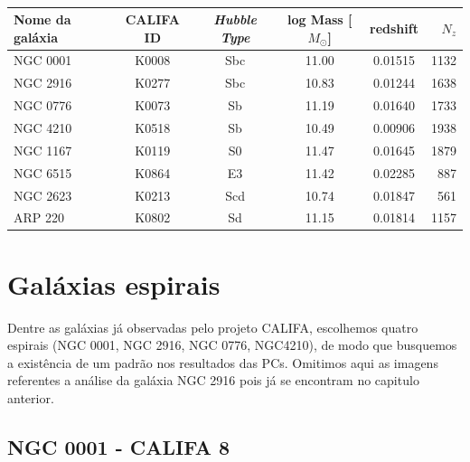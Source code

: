 \begin{table}
	\caption[Relação de galáxias do CALIFA usadas neste trabalho.]
	{}
	\begin{tabular}{l c c c c r}
		Nome da galáxia & CALIFA ID & {\em Hubble Type} & log Mass [$M_\odot$] & redshift & $N_z$ \\
		\midrule
		NGC 0001 & K0008 & Sbc & 11.00 & 0.01515 & 1132 \\
		NGC 2916 & K0277 & Sbc & 10.83 & 0.01244 & 1638 \\
		NGC 0776 & K0073 & Sb  & 11.19 & 0.01640 & 1733 \\
		NGC 4210 & K0518 & Sb  & 10.49 & 0.00906 & 1938 \\
		NGC 1167 & K0119 & S0  & 11.47 & 0.01645 & 1879 \\
		NGC 6515 & K0864 & E3  & 11.42 & 0.02285 & 887  \\
		NGC 2623 & K0213 & Scd & 10.74 & 0.01847 & 561  \\
		ARP 220  & K0802 & Sd  & 11.15 & 0.01814 & 1157 \\
	\end{tabular}
	\label{tab:amostraGalaxias}
\end{table}

\section{Galáxias espirais}
\label{sec:result:spirals}

Dentre as galáxias já observadas pelo projeto CALIFA, escolhemos quatro espirais (NGC 0001, NGC 2916, NGC 0776,
NGC4210), de modo que busquemos a existência de um padrão nos resultados das PCs. Omitimos aqui as imagens referentes a
análise da galáxia NGC 2916 pois já se encontram no capitulo anterior.

\subsection{NGC 0001 - CALIFA 8}

